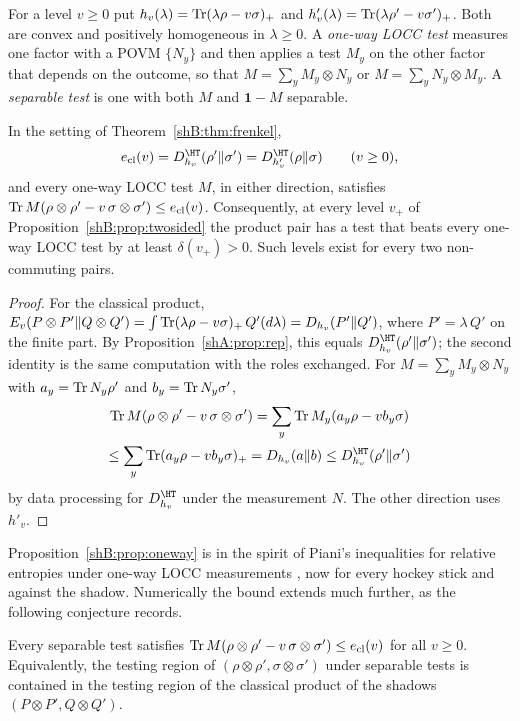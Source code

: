 For a level $v\ge0$ put $h_v(\lambda)=\operatorname{Tr}(\lambda\rho-v\sigma)_+$ and $h'_v(\lambda)=\operatorname{Tr}(\lambda\rho'-v\sigma')_+$. Both are convex and positively homogeneous in $\lambda\ge0$. A \emph{one-way LOCC test} measures one factor with a POVM $\{N_y\}$ and then applies a test $M_y$ on the other factor that depends on the outcome, so that $M=\sum_yM_y\otimes N_y$ or $M=\sum_yN_y\otimes M_y$. A \emph{separable test} is one with both $M$ and $\mathbf 1-M$ separable.

\begin{proposition}\label{shB:prop:oneway}
In the setting of Theorem~\ref{shB:thm:frenkel},
\[
e_{\mathrm{cl}}(v)=D^\HT_{h_v}(\rho'\|\sigma')=D^\HT_{h'_v}(\rho\|\sigma)\qquad(v\ge0),
\]
and every one-way LOCC test $M$, in either direction, satisfies $\operatorname{Tr} M(\rho\otimes\rho'-v\,\sigma\otimes\sigma')\le e_{\mathrm{cl}}(v)$. Consequently, at every level $v_+$ of Proposition~\ref{shB:prop:twosided} the product pair has a test that beats every one-way LOCC test by at least $\delta(v_+)>0$. Such levels exist for every two non-commuting pairs.
\end{proposition}

\begin{proof}
For the classical product, $E_v(P\otimes P'\|Q\otimes Q')=\int\operatorname{Tr}(\lambda\rho-v\sigma)_+\,Q'(d\lambda)=D_{h_v}(P'\|Q')$, where $P'=\lambda\,Q'$ on the finite part. By Proposition~\ref{shA:prop:rep}, this equals $D^\HT_{h_v}(\rho'\|\sigma')$; the second identity is the same computation with the roles exchanged. For $M=\sum_yM_y\otimes N_y$ with $a_y=\operatorname{Tr} N_y\rho'$ and $b_y=\operatorname{Tr} N_y\sigma'$,
\begin{multline*}
\Tr M(\rho\otimes\rho'-v\,\sigma\otimes\sigma')=\sum_y\Tr M_y(a_y\rho-vb_y\sigma)\\
\le\sum_y\Tr(a_y\rho-vb_y\sigma)_+=D_{h_v}(a\|b)\le D^\HT_{h_v}(\rho'\|\sigma')
\end{multline*}
by data processing for $D^\HT_{h_v}$ under the measurement $N$. The other direction uses $h'_v$.
\end{proof}

Proposition~\ref{shB:prop:oneway} is in the spirit of Piani's inequalities for relative entropies under one-way LOCC measurements \cite{Piani2009}, now for every hockey stick and against the shadow. Numerically the bound extends much further, as the following conjecture records.

\begin{conjecture}\label{shB:conj:sep}
Every separable test satisfies $\operatorname{Tr} M(\rho\otimes\rho'-v\,\sigma\otimes\sigma')\le e_{\mathrm{cl}}(v)$ for all $v\ge0$. Equivalently, the testing region of $(\rho\otimes\rho',\sigma\otimes\sigma')$ under separable tests is contained in the testing region of the classical product of the shadows $(P\otimes P',Q\otimes Q')$.
\end{conjecture}

